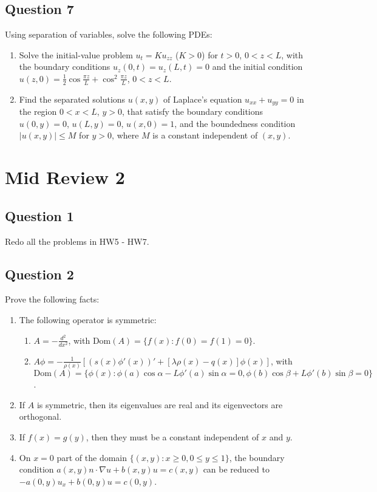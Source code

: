 \documentclass[lang=en,11pt]{template}
\begin{document}
\section*{Question 7}
Using separation of variables, solve the following PDEs:
\begin{enumerate}
    \item Solve the initial-value problem $u_t = K u_{zz}$ ($K > 0$) for $t > 0$, $0 < z < L$, with the boundary conditions $u_z(0, t) = u_z(L, t) = 0$ and the initial condition $u(z, 0) = \frac{1}{2}\cos\frac{\pi z}{L} + \cos^2\frac{\pi z}{L}$, $0 < z < L$.
    \item Find the separated solutions $u(x, y)$ of Laplace's equation $u_{xx} + u_{yy} = 0$ in the region $0 < x < L$, $y > 0$, that satisfy the boundary conditions $u(0, y) = 0$, $u(L, y) = 0$, $u(x, 0) = 1$, and the boundedness condition $|u(x, y)| \leq M$ for $y > 0$, where $M$ is a constant independent of $(x, y)$.
\end{enumerate}



\chapter{Mid Review 2}

\section*{Question 1}
Redo all the problems in HW5 - HW7.

\section*{Question 2}
Prove the following facts:
\begin{enumerate}
    \item The following operator is symmetric:
    \begin{enumerate}
        \item $A = -\frac{d^2}{dx^2}$, with $\text{Dom}(A) = \{f(x) : f(0) = f(1) = 0\}$.
        \item $A\phi = -\frac{1}{\rho(x)}\left[(s(x)\phi'(x))' + [\lambda \rho(x) - q(x)]\phi(x)\right]$, with $\text{Dom}(A) = \{\phi(x) : \phi(a)\cos \alpha - L\phi'(a)\sin \alpha = 0, \phi(b)\cos \beta + L\phi'(b)\sin \beta = 0\}$.
    \end{enumerate}
    \item If $A$ is symmetric, then its eigenvalues are real and its eigenvectors are orthogonal.
    \item If $f(x) = g(y)$, then they must be a constant independent of $x$ and $y$.
    \item On $x = 0$ part of the domain $\{(x, y) : x \geq 0, 0 \leq y \leq 1\}$, the boundary condition $a(x, y)n \cdot \nabla u + b(x, y)u = c(x, y)$ can be reduced to $-a(0, y)u_x + b(0, y)u = c(0, y)$.
\end{enumerate}
\end{document}
